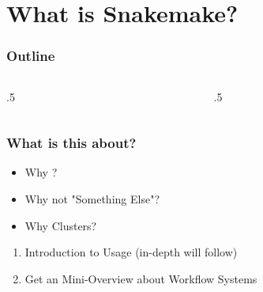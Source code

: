 \section{What is Snakemake?}

\ifdefined\ishandout
{
	\frame{
		\tableofcontents[currentsection]
	}
}
\else
\begin{frame}
	\frametitle{Outline}
	\begin{columns}[t]
		\begin{column}{.5\textwidth}
			\tableofcontents[sections={1-7},currentsection]
		\end{column}
		\begin{column}{.5\textwidth}
			\tableofcontents[sections={8-15},currentsection]
		\end{column}
	\end{columns}
\end{frame}
\fi

\begin{frame}
	\frametitle{What is this about?}
	\begin{question}[Questions]
		\begin{itemize}
			\item Why \Snakemake?
			\item Why not "Something Else"?
			\item Why Clusters?
		\end{itemize}
	\end{question}
	\begin{docs}[Objectives]
		\begin{enumerate}
			\item Introduction to \Snakemake Usage (in-depth will follow)
			\item Get an Mini-Overview about Workflow Systems
		\end{enumerate}
	\end{docs}
\end{frame}

